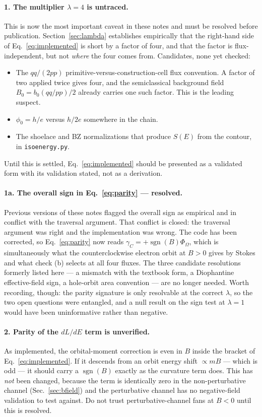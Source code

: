 \documentclass[11pt]{article}
\newcommand{\Om}{\Omega}
\newcommand{\Bfield}{B}
\newcommand{\sgn}{\operatorname{sgn}}
\newcommand{\Phib}{\Phi_{\!\Om}}
\newcommand{\code}[1]{\texttt{#1}}
\begin{document}
\paragraph{1. The multiplier $\lambda = 4$ is untraced.}
This is now the most important caveat in these notes and must be
resolved before publication.  Section~\ref{sec:lambda} establishes
empirically that the right-hand side of Eq.~\eqref{eq:implemented} is
short by a factor of four, and that the factor is flux-independent, but
not \emph{where} the four comes from.  Candidates, none yet checked:
\begin{itemize}
\item The $qq/(2pp)$ primitive-versus-construction-cell flux convention.
  A factor of two applied twice gives four, and the semiclassical
  background field $\Bfield_0 = b_0 (qq/pp)/2$ already carries one such
  factor.  This is the leading suspect.
\item $\phi_0 = h/e$ versus $h/2e$ somewhere in the chain.
\item The shoelace and BZ normalizations that produce $S(E)$ from the
  contour, in \code{isoenergy.py}.
\end{itemize}
Until this is settled, Eq.~\eqref{eq:implemented} should be presented as
a validated form with its validation stated, not as a derivation.

\paragraph{1a. The overall sign in Eq.~\eqref{eq:parity} --- resolved.}
Previous versions of these notes flagged the overall sign as empirical
and in conflict with the traversal argument.  That conflict is closed:
the traversal argument was right and the implementation was wrong.  The
code has been corrected, so Eq.~\eqref{eq:parity} now reads
$\gamma_C = +\sgn(\Bfield)\Phib$, which is simultaneously what the
counterclockwise electron orbit at $\Bfield > 0$ gives by Stokes and what
check (b) selects at all four fluxes.  The three candidate resolutions
formerly listed here --- a mismatch with the textbook form, a
Diophantine effective-field sign, a hole-orbit area convention --- are no
longer needed.  Worth recording, though: the parity signature is only
resolvable at the correct $\lambda$, so the two open questions were
entangled, and a null result on the sign test at $\lambda = 1$ would have
been uninformative rather than negative.

\paragraph{2. Parity of the $dL/dE$ term is unverified.}
As implemented, the orbital-moment correction is even in $\Bfield$
inside the bracket of Eq.~\eqref{eq:implemented}.  If it descends from an
orbit energy shift $\propto m\Bfield$ --- which is odd --- it should
carry a $\sgn(\Bfield)$ exactly as the curvature term does.  This has
\emph{not} been changed, because the term is identically zero in the
non-perturbative channel (Sec.~\ref{sec:bfield}) and the perturbative
channel has no negative-field validation to test against.  Do not trust
perturbative-channel fans at $\Bfield<0$ until this is resolved.
\end{document}

